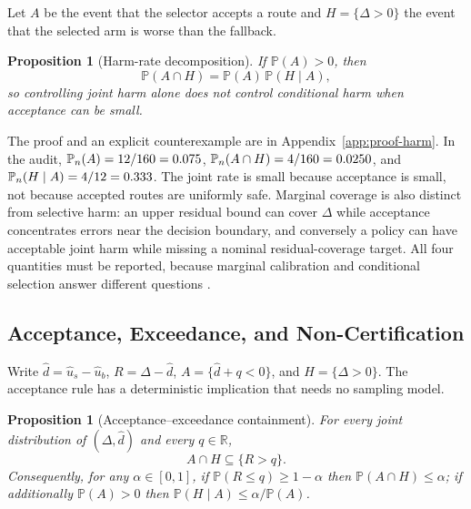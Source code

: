 \documentclass[10pt,twocolumn]{article}
\newtheorem{proposition}[theorem]{Proposition}
\newcounter{algorithm}
\newcommand{\Pp}{\mathbb{P}}
\newcommand{\R}{\mathbb{R}}
\begin{document}
Let $A$ be the event that the selector accepts a route and $H=\{\Delta>0\}$ the
event that the selected arm is worse than the fallback.

\begin{proposition}[Harm-rate decomposition]
\label{prop:harm}
If $\Pp(A)>0$, then
\begin{equation}
 \Pp(A\cap H)=\Pp(A)\,\Pp(H\mid A),
 \label{eq:harm}
\end{equation}
so controlling joint harm alone does not control conditional harm when
acceptance can be small.
\end{proposition}

The proof and an explicit counterexample are in Appendix~\ref{app:proof-harm}.
In the audit, $\Pp_n(A)=\ConfirmAccepted/\ConfirmN=\ConfirmAcceptedRate$,
$\Pp_n(A\cap H)=\ConfirmHarms/\ConfirmN=\ConfirmJointHarmRate$, and
$\Pp_n(H\mid A)=\ConfirmHarms/\ConfirmAccepted=\ConfirmConditionalHarmRate$.  The
joint rate is small because acceptance is small, not because accepted routes are
uniformly safe.  Marginal coverage is also distinct from selective harm: an upper
residual bound can cover $\Delta$ while acceptance concentrates errors near the
decision boundary, and conversely a policy can have acceptable joint harm while
missing a nominal residual-coverage target.  All four quantities must be
reported, because marginal calibration and conditional selection answer different
questions \citep{vovk2005algorithmic,angelopoulos2021gentle}.

\subsection{Acceptance, Exceedance, and Non-Certification}

Write $\widehat d=\widehat u_s-\widehat u_b$, $R=\Delta-\widehat d$,
$A=\{\widehat d+q<0\}$, and $H=\{\Delta>0\}$.  The acceptance rule has a
deterministic implication that needs no sampling model.

\begin{proposition}[Acceptance--exceedance containment]
\label{prop:containment}
For every joint distribution of $(\Delta,\widehat d)$ and every $q\in\R$,
\begin{equation}
 A\cap H\subseteq\{R>q\}.
 \label{eq:containment}
\end{equation}
Consequently, for any $\alpha\in[0,1]$, if $\Pp(R\le q)\ge1-\alpha$ then
$\Pp(A\cap H)\le\alpha$; if additionally $\Pp(A)>0$ then
$\Pp(H\mid A)\le\alpha/\Pp(A)$.
\end{proposition}
\end{document}
